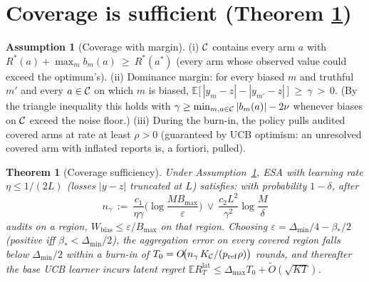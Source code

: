 \documentclass[11pt]{article}
\newtheorem{theorem}{Theorem}
\theoremstyle{definition}\newtheorem{definition}{Definition}
\theoremstyle{definition}\newtheorem{assumption}{Assumption}
\newcommand{\Rstar}{R^{\ast}}\newcommand{\astar}{a^{\ast}}
\newcommand{\E}{\mathbb{E}}\newcommand{\Prob}{\mathbb{P}}
\newcommand{\nfl}{\nu}                      %
\begin{document}
\section{Coverage is sufficient (Theorem \texorpdfstring{\ref*{thm:upper}}{3})}
\label{app:upper}

\begin{assumption}[Coverage with margin]\label{ass:coverage}
(i) $\mathcal{C}$ contains every arm $a$ with
$\Rstar(a)+\max_m b_m(a)\ \ge\ \Rstar(\astar)$ (every arm whose observed value
could exceed the optimum's).
(ii) Dominance margin: for every biased $m$ and truthful $m'$ and every $a\in\mathcal{C}$
on which $m$ is biased,
$\E\big[\,|y_m-z|-|y_{m'}-z|\,\big]\ \ge\ \gamma\ >\ 0$.
(By the triangle inequality this holds with
$\gamma\ge\min_{m,a\in\Cov}|b_m(a)|-2\nfl$ whenever biases on $\mathcal{C}$ exceed the
noise floor.)
(iii) During the burn-in, the policy pulls audited covered arms at rate at least
$\rho>0$ (guaranteed by UCB optimism: an unresolved covered arm with inflated
reports is, a fortiori, pulled).
\end{assumption}

\begin{theorem}[Coverage sufficiency]\label{thm:upper}
Under Assumption~\ref{ass:coverage}, ESA with learning rate $\eta\le 1/(2L)$
(losses $|y-z|$ truncated at $L$) satisfies: with probability $1-\delta$, after
\[
n_\gamma\ :=\ \frac{c_1}{\eta\gamma}\Big(\log\frac{M B_{\max}}{\varepsilon}\Big)
\ \vee\ \frac{c_2 L^2}{\gamma^{2}}\log\frac{M}{\delta}
\]
audits on a region, $W_{\mathrm{bias}}\le \varepsilon/B_{\max}$ on that region.
Choosing $\varepsilon=\Delta_{\min}/4-\beta_\ast/2$ (positive iff
$\beta_\ast<\Delta_{\min}/2$), the aggregation error on every covered region falls
below $\Delta_{\min}/2$ within a burn-in of
$T_0=O\!\big(n_\gamma\,K_{\mathcal{C}}/(p_{\mathrm{ref}}\rho)\big)$ rounds, and thereafter
the base UCB learner incurs latent regret
$\E R_T^{\mathrm{lat}} \le \Delta_{\max}T_0 + \tilde O(\sqrt{KT})$.
\end{theorem}
\end{document}
